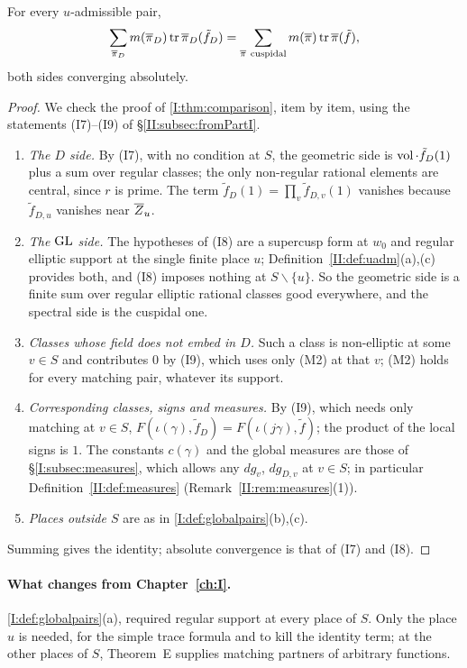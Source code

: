 \begin{theorem}\label{II:thm:comparison2}
For every $u$-admissible pair,
\[ \sum_{\overline{\pi}_D}m(\overline{\pi}_D)\operatorname{tr}\overline{\pi}_D(\tilde f_D)=\sum_{\overline{\pi}\ \mathrm{cuspidal}}m(\overline{\pi})\operatorname{tr}\overline{\pi}(\tilde f), \]
both sides converging absolutely.
\end{theorem}
\begin{proof}
We check the proof of \cref{I:thm:comparison}, item by item, using the statements (I7)--(I9) of \S\ref{II:subsec:fromPartI}.
\begin{enumerate}[label=(\arabic*)]
\item \emph{The $D$ side.} By (I7), with no condition at $S$, the geometric side is $\operatorname{vol}\cdot\tilde f_D(1)$ plus a sum over regular classes; the only non-regular rational elements are central, since $r$ is prime. The term $\tilde f_D(1)=\prod_v\tilde f_{D,v}(1)$ vanishes because $\tilde f_{D,u}$ vanishes near $\overline{Z}_u$.
\item \emph{The $\mathrm{GL}$ side.} The hypotheses of (I8) are a supercusp form at $w_0$ and regular elliptic support at the single finite place $u$; Definition~\ref{II:def:uadm}(a),(c) provides both, and (I8) imposes nothing at $S\smallsetminus\{u\}$. So the geometric side is a finite sum over regular elliptic rational classes good everywhere, and the spectral side is the cuspidal one.
\item \emph{Classes whose field does not embed in $D$.} Such a class is non-elliptic at some $v\in S$ and contributes $0$ by (I9), which uses only (M2) at that $v$; (M2) holds for every matching pair, whatever its support.
\item \emph{Corresponding classes, signs and measures.} By (I9), which needs only matching at $v\in S$, $F(\iota(\gamma),\tilde f_D)=F(\iota(j\gamma),\tilde f)$; the product of the local signs is $1$. The constants $c(\gamma)$ and the global measures are those of \S\ref{I:subsec:measures}, which allows any $dg_v$, $dg_{D,v}$ at $v\in S$; in particular Definition~\ref{II:def:measures} (Remark~\ref{II:rem:measures}(1)).
\item \emph{Places outside $S$} are as in \cref{I:def:globalpairs}(b),(c).
\end{enumerate}
Summing gives the identity; absolute convergence is that of (I7) and (I8).
\end{proof}

\paragraph{What changes from Chapter~\ref{ch:I}.} \cref{I:def:globalpairs}(a), required regular support at every place of $S$. Only the place $u$ is needed, for the simple trace formula and to kill the identity term; at the other places of $S$, Theorem~E supplies matching partners of arbitrary functions.

